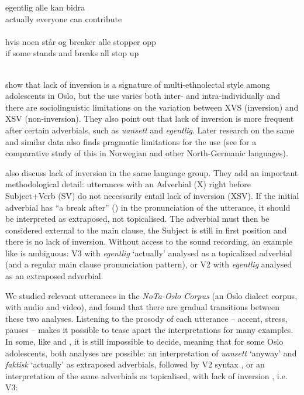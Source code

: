 \documentclass[output=paper,colorlinks,citecolor=brown,modfonts,nonflat]{../langscibook}
\begin{document}
\ea%
    \label{ex:emilsen:15}
\gll egentlig alle kan bidra \\
 actually everyone can contribute \\
   \\

\ex%
    \label{ex:emilsen:16}
\gll hvis noen står og breaker alle stopper opp \\
 if some stands and breaks all stop up \\
   \\
\z

\citet{OpsahlNistov2010} show that lack of inversion is a signature of multi-ethnolectal style among adolescents in Oslo, but the use varies both inter- and intra-individually and there are sociolinguistic limitations on the variation between XVS (inversion) and XSV (non-inversion). They also point out that lack of inversion is more frequent after certain adverbials, such as \textit{uansett} and \textit{egentlig}. Later research on the same and similar data also finds pragmatic limitations for the use (see \citet{FreywaldEtAl2015} for a comparative study of this in Norwegian and other North-Germanic languages).

\citet{SvendsenRøyneland2008} also discuss lack of inversion in the same language group. They add an important methodological detail: utterances with an Adverbial (X) right before Subject+Verb (SV) do not necessarily entail lack of inversion (XSV). If the initial adverbial has “a break after” (\citealt[75]{SvendsenRøyneland2008}) in the pronunciation of the utterance, it should be interpreted as extraposed, not topicalised. The adverbial must then be considered external to the main clause, the Subject is still in first position and there is no lack of inversion. Without access to the sound recording, an example like  is ambiguous: V3 with \textit{egentlig} ‘actually’ analysed as a topicalized adverbial (and a regular main clause pronunciation pattern), or V2 with \textit{egentlig} analysed as an extraposed adverbial.

We studied relevant utterances in the \textit{NoTa-Oslo Corpus} (an Oslo dialect corpus, with audio and video), and found that there are gradual transitions between these two analyses. Listening to the prosody of each utterance – accent, stress, pauses – makes it possible to tease apart the interpretations for many examples. In some, like  and , it is still impossible to decide, meaning that for some Oslo adolescents, both analyses are possible: an interpretation of \textit{uansett} ‘anyway’ and \textit{faktisk} ‘actually’ as extraposed adverbials, followed by V2 syntax , or an interpretation of the same adverbials as topicalised, with lack of inversion , i.e. V3:
\end{document}
